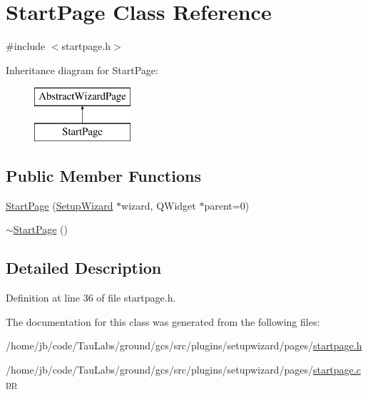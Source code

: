 \hypertarget{class_start_page}{\section{\-Start\-Page \-Class \-Reference}
\label{class_start_page}
}


{\ttfamily \#include $<$startpage.\-h$>$}

\-Inheritance diagram for \-Start\-Page\-:\begin{figure}[H]
\begin{center}
\leavevmode
\includegraphics[height=2.000000cm]{class_start_page}
\end{center}
\end{figure}
\subsection*{\-Public \-Member \-Functions}
\begin{DoxyCompactItemize}
\item 
\hyperlink{group___setup_gac7f13cdee5f6c7c47763882247c4dec8}{\-Start\-Page} (\hyperlink{class_setup_wizard}{\-Setup\-Wizard} $\ast$wizard, \-Q\-Widget $\ast$parent=0)
\item 
\hyperlink{group___setup_ga03a08c78d6a2b73a4fe95bfa89e74314}{$\sim$\-Start\-Page} ()
\end{DoxyCompactItemize}


\subsection{\-Detailed \-Description}


\-Definition at line 36 of file startpage.\-h.



\-The documentation for this class was generated from the following files\-:\begin{DoxyCompactItemize}
\item 
/home/jb/code/\-Tau\-Labs/ground/gcs/src/plugins/setupwizard/pages/\hyperlink{startpage_8h}{startpage.\-h}\item 
/home/jb/code/\-Tau\-Labs/ground/gcs/src/plugins/setupwizard/pages/\hyperlink{startpage_8cpp}{startpage.\-cpp}\end{DoxyCompactItemize}

